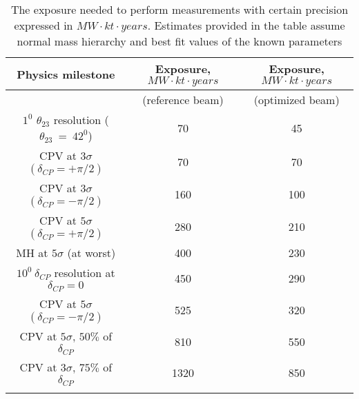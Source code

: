 \begin{table}[h]
  \centering
  \begin{center}
  \caption{ The exposure needed to perform measurements with certain precision expressed in $MW \cdot kt \cdot years$. Estimates provided in the table assume normal mass hierarchy and best fit values of the known parameters }
  \begin{tabular}{|c|c|c|}
  \hline  
  Physics milestone & Exposure, $MW \cdot kt \cdot years$ & Exposure, $MW \cdot kt \cdot years$ \\ \hline
   & (reference beam) & (optimized beam) \\ \hline
  $1^0$ $\theta_{23}$ resolution ($\theta_{23}~=~42^0$) & 70 & 45 \\ \hline
  CPV at $3\sigma$ $(\delta_{CP}=+\pi/2)$ & 70 & 70 \\ \hline
  CPV at $3\sigma$ $(\delta_{CP}=-\pi/2)$ & 160 & 100 \\ \hline
  CPV at $5\sigma$ $(\delta_{CP}=+\pi/2)$ & 280 & 210 \\ \hline
  MH at $5\sigma$ (at worst) & 400 & 230 \\ \hline
  $10^0~\delta_{CP}$ resolution at $\delta_{CP}=0$ & 450 & 290 \\ \hline
  CPV at $5\sigma$ $(\delta_{CP}=-\pi/2)$ & 525 & 320 \\ \hline
  CPV at $5\sigma$, $50\%$ of $\delta_{CP}$ & 810 & 550 \\ \hline
  CPV at $3\sigma$, $75\%$ of $\delta_{CP}$ & 1320 & 850 \\ \hline
  \label{tab:exposures_needed}
  \end{tabular}
  \end{center}
\end{table}

